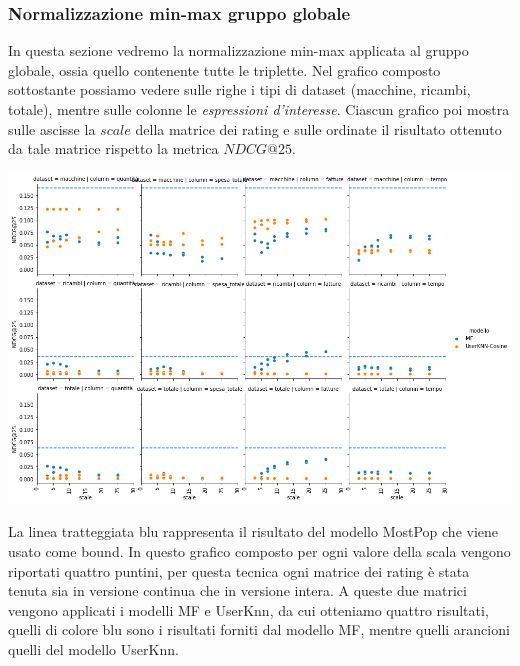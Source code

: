 

\subsubsection{Normalizzazione min-max gruppo globale}
In questa sezione vedremo la normalizzazione min-max applicata al gruppo globale, ossia quello contenente tutte le triplette.
Nel grafico composto sottostante possiamo vedere sulle righe i tipi di dataset (macchine, ricambi, totale), mentre sulle colonne le \textit{espressioni d'interesse}. Ciascun grafico poi mostra sulle ascisse la $scale$ della matrice dei rating e sulle ordinate il risultato ottenuto da tale matrice rispetto la metrica $NDCG@25$.
\begin{center}
    \includegraphics[width=16cm]{figures/risultati_minmax_globale.png}
    \label{tab:minmax_globale}
\end{center}
La linea tratteggiata blu rappresenta il risultato del modello MostPop che viene usato come bound.
In questo grafico composto per ogni valore della scala vengono riportati quattro puntini, per questa tecnica ogni matrice dei rating è stata tenuta sia in versione continua che in versione intera. A queste due matrici vengono applicati i modelli MF e UserKnn, da cui otteniamo quattro risultati, quelli di colore blu sono i risultati forniti dal modello MF, mentre quelli arancioni quelli del modello UserKnn.

